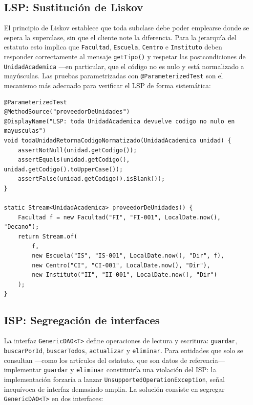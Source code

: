 \subsection{LSP: Sustitución de Liskov}
\label{subsec:solid-lsp}

El principio de Liskov establece que toda subclase debe poder emplearse donde se espera
la superclase, sin que el cliente note la diferencia. Para la jerarquía del estatuto esto
implica que \texttt{Facultad}, \texttt{Escuela}, \texttt{Centro} e \texttt{Instituto}
deben responder correctamente al mensaje \texttt{getTipo()} y respetar las postcondiciones
de \texttt{UnidadAcademica} ---en particular, que el código no es nulo y está normalizado
a mayúsculas. Las pruebas parametrizadas con \texttt{@ParameterizedTest} son el mecanismo
más adecuado para verificar el LSP de forma sistemática:

\begin{lstlisting}[style=javaStyle,
  caption={Verificación del LSP mediante prueba parametrizada.},
  label={lst:lsp-prueba}]
@ParameterizedTest
@MethodSource("proveedorDeUnidades")
@DisplayName("LSP: toda UnidadAcademica devuelve codigo no nulo en mayusculas")
void todaUnidadRetornaCodigoNormatizado(UnidadAcademica unidad) {
    assertNotNull(unidad.getCodigo());
    assertEquals(unidad.getCodigo(), unidad.getCodigo().toUpperCase());
    assertFalse(unidad.getCodigo().isBlank());
}

static Stream<UnidadAcademica> proveedorDeUnidades() {
    Facultad f = new Facultad("FI", "FI-001", LocalDate.now(), "Decano");
    return Stream.of(
        f,
        new Escuela("IS", "IS-001", LocalDate.now(), "Dir", f),
        new Centro("CI", "CI-001", LocalDate.now(), "Dir"),
        new Instituto("II", "II-001", LocalDate.now(), "Dir")
    );
}
\end{lstlisting}

\subsection{ISP: Segregación de interfaces}
\label{subsec:solid-isp}

La interfaz \texttt{GenericDAO<T>} define operaciones de lectura y escritura:
\texttt{guardar}, \texttt{buscarPorId}, \texttt{buscarTodos}, \texttt{actualizar}
y \texttt{eliminar}. Para entidades que solo se consultan ---como los artículos del
estatuto, que son datos de referencia--- implementar \texttt{guardar} y \texttt{eliminar}
constituiría una violación del ISP: la implementación forzaría a lanzar
\texttt{UnsupportedOperationException}, señal inequívoca de interfaz demasiado amplia.
La solución consiste en segregar \texttt{GenericDAO<T>} en dos interfaces:

